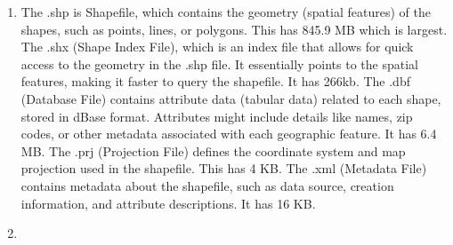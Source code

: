 \documentclass[
  letterpaper,
  DIV=11,
  numbers=noendperiod]{scrartcl}
\providecommand{\tightlist}{%
  \setlength{\itemsep}{0pt}\setlength{\parskip}{0pt}}\usepackage{longtable,booktabs,array}
\begin{document}
\begin{enumerate}
\def\labelenumi{\arabic{enumi}.}
\tightlist
\item
  The .shp is Shapefile, which contains the geometry (spatial features)
  of the shapes, such as points, lines, or polygons. This has 845.9 MB
  which is largest. The .shx (Shape Index File), which is an index file
  that allows for quick access to the geometry in the .shp file. It
  essentially points to the spatial features, making it faster to query
  the shapefile. It has 266kb. The .dbf (Database File) contains
  attribute data (tabular data) related to each shape, stored in dBase
  format. Attributes might include details like names, zip codes, or
  other metadata associated with each geographic feature. It has 6.4 MB.
  The .prj (Projection File) defines the coordinate system and map
  projection used in the shapefile. This has 4 KB. The .xml (Metadata
  File) contains metadata about the shapefile, such as data source,
  creation information, and attribute descriptions. It has 16 KB.
\item
\end{enumerate}
\end{document}
